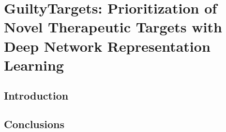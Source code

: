 \chapter{GuiltyTargets: Prioritization of Novel Therapeutic Targets with Deep Network Representation Learning}\label{chap:guiltytargets}

\section*{Introduction}

\vspace*{\fill}



\section*{Conclusions}
